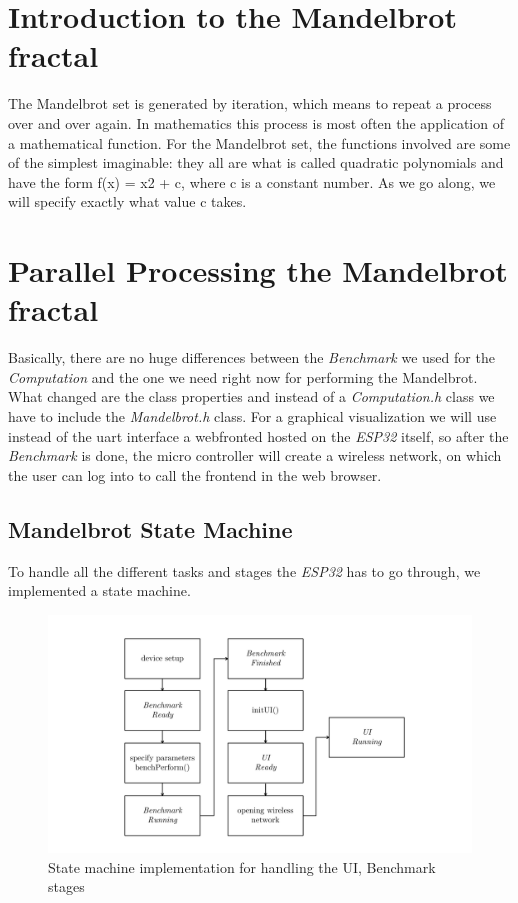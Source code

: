 \newpage

\section{Introduction to the Mandelbrot fractal}
The Mandelbrot set is generated by iteration, which means to repeat a process over and over again. In mathematics this process is most often the application of a mathematical function.
For the Mandelbrot set, the functions involved are some of the simplest imaginable: they all are what is called quadratic polynomials and have the form f(x) = x2 + c, where c is a constant number. As we go along, we will specify exactly what value c takes.

\newpage

\section{Parallel Processing the Mandelbrot fractal}

Basically, there are no huge differences between the \textit{Benchmark} we used for the \textit{Computation} and the one we need right now for performing the Mandelbrot. What changed are the class properties and instead of a \textit{Computation.h} class we have to include the \textit{Mandelbrot.h} class. For a graphical visualization we will use instead of the uart interface a webfronted hosted on the \textit{ESP32} itself, so after the \textit{Benchmark} is done, the micro controller will create a wireless network, on which the user can log into to call the frontend in the web browser.

\subsection{Mandelbrot State Machine}

To handle all the different tasks and stages the \textit{ESP32} has to go through, we implemented a state machine.

\begin{figure}[htbp]
	\centerline{\includegraphics[width=1.1\linewidth]{images/State-Machine.pdf}}
	\caption{ State machine implementation for handling the UI, Benchmark stages }
	\label{fig:stateMachine}
\end{figure}  

